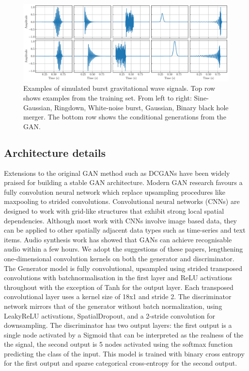 \documentclass[12pt]{iopart}
\begin{document}
\begin{figure}
    \centering
    \includegraphics[width=\textwidth]{figures/train_gen.pdf}
    \caption{Examples of simulated burst gravitational wave signals. Top row shows examples from the training set. From left to right: Sine-Gaussian, Ringdown, White-noise burst, Gaussian, Binary black hole merger. The bottom row shows the conditional generations from the GAN. }
    \label{fig:train}
\end{figure}

\subsection{Architecture details}
Extensions to the original GAN method such as  DCGANs \cite{Radford2015} have been widely praised for building a stable GAN architecture. Modern GAN research favours a fully convolution neural network which replace upsampling procedures like maxpooling to strided convolutions. Convolutional neural networks (CNNs) are designed to work with grid-like structures that exhibit strong local spatial dependencies.  Although most work with CNNs involve image based data, they can be applied to other spatially adjacent data types such as time-series and text items. Audio synthesis work \cite{DBLP:journals/corr/abs-1809-11096} has showed that GANs can achieve recognisable audio within a few hours. We adopt the suggestions of these papers, lengthening one-dimensional convolution kernels on both the generator and discriminator. The Generator model is fully convolutional, upsampled using strided transposed convolutions with batchnormalisation in the first layer and ReLU activations throughout with the exception of Tanh for the output layer. Each transposed convolutional layer uses a kernel size of 18x1 and stride 2. The discriminator network mirrors that of the generator without batch normalization, using LeakyReLU activations, SpatialDropout, and a 2-stride convolution for downsampling. The discriminator has two output layers: the first output is a single node activated by a Sigmoid that can be interpreted as the realness of the the signal, the second output is 5 nodes activated using the softmax function predicting the class of the input. This model is trained with binary cross entropy for the first output and sparse categorical cross-entropy for the second output.
\end{document}
